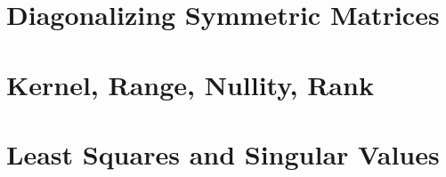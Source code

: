 \documentclass[12pt]{book}
\newcommand{\1}{{\mathrm 1\hspace*{-0.4ex}%
\rule{0.1ex}{1.52ex}\hspace*{0.2ex}}}
\begin{document}
%
 
%


%





%

%


\section{Diagonalizing Symmetric Matrices}

%

%

%
\section{Kernel, Range, Nullity, Rank}

%

%
\section{Least Squares and Singular Values}

%


%
%


 


\normalsize

{}
\printindex

\newpage

\end{document}
